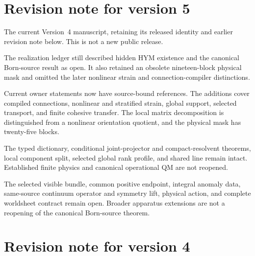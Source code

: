 \documentclass[11pt]{article}
\begin{document}
\section*{Revision note for version 5}
\begin{description}[leftmargin=2.5cm,style=nextline]
\item[Supersedes.]
The current Version~4 manuscript, retaining its released identity and
earlier revision note below. This is not a new public release.
\item[Reason.]
The realization ledger still described hidden HYM existence and the
canonical Born-source result as open. It also retained an obsolete
nineteen-block physical mask and omitted the later nonlinear strain and
connection-compiler distinctions.
\item[Resolution.]
Current owner statements now have source-bound references. The additions
cover compiled connections, nonlinear and stratified strain, global
support, selected transport, and finite cohesive transfer.
The local matrix decomposition is distinguished from a nonlinear
orientation quotient, and the physical mask has twenty-five blocks.
\item[Retained content.]
The typed dictionary, conditional joint-projector and compact-resolvent
theorems, local component split, selected global rank profile, and shared
line remain intact. Established finite physics and canonical operational
QM are not reopened.
\item[Open boundary.]
The selected visible bundle, common positive endpoint, integral anomaly
data, same-source continuum operator and symmetry lift, physical action,
and complete worldsheet contract remain open. Broader apparatus
extensions are not a reopening of the canonical Born-source theorem.
\end{description}

\section*{Revision note for version 4}
\end{document}
